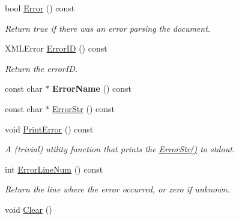 \begin{DoxyCompactItemize}
\item 
bool \hyperlink{classtinyxml2_1_1XMLDocument_abf0f9ac4c3aa5698a785937f71f7a69f}{Error} () const \hypertarget{classtinyxml2_1_1XMLDocument_abf0f9ac4c3aa5698a785937f71f7a69f}{}\label{classtinyxml2_1_1XMLDocument_abf0f9ac4c3aa5698a785937f71f7a69f}

\begin{DoxyCompactList}\small\item\em Return true if there was an error parsing the document. \end{DoxyCompactList}\item 
X\+M\+L\+Error \hyperlink{classtinyxml2_1_1XMLDocument_a34903418c9e83f27945c2c533839e350}{Error\+ID} () const \hypertarget{classtinyxml2_1_1XMLDocument_a34903418c9e83f27945c2c533839e350}{}\label{classtinyxml2_1_1XMLDocument_a34903418c9e83f27945c2c533839e350}

\begin{DoxyCompactList}\small\item\em Return the error\+ID. \end{DoxyCompactList}\item 
const char $\ast$ {\bfseries Error\+Name} () const \hypertarget{classtinyxml2_1_1XMLDocument_a7ff8b68f87042d535841b0afd2c82161}{}\label{classtinyxml2_1_1XMLDocument_a7ff8b68f87042d535841b0afd2c82161}

\item 
const char $\ast$ \hyperlink{classtinyxml2_1_1XMLDocument_afa6df3166e31985f1e54bd2073e2faad}{Error\+Str} () const 
\item 
void \hyperlink{classtinyxml2_1_1XMLDocument_a7545cc9a9a67eee9307c001aa316a388}{Print\+Error} () const \hypertarget{classtinyxml2_1_1XMLDocument_a7545cc9a9a67eee9307c001aa316a388}{}\label{classtinyxml2_1_1XMLDocument_a7545cc9a9a67eee9307c001aa316a388}

\begin{DoxyCompactList}\small\item\em A (trivial) utility function that prints the \hyperlink{classtinyxml2_1_1XMLDocument_afa6df3166e31985f1e54bd2073e2faad}{Error\+Str()} to stdout. \end{DoxyCompactList}\item 
int \hyperlink{classtinyxml2_1_1XMLDocument_a22876562274ac31884bafb9e5cb64aa1}{Error\+Line\+Num} () const \hypertarget{classtinyxml2_1_1XMLDocument_a22876562274ac31884bafb9e5cb64aa1}{}\label{classtinyxml2_1_1XMLDocument_a22876562274ac31884bafb9e5cb64aa1}

\begin{DoxyCompactList}\small\item\em Return the line where the error occurred, or zero if unknown. \end{DoxyCompactList}\item 
void \hyperlink{classtinyxml2_1_1XMLDocument_a65656b0b2cbc822708eb351504178aaf}{Clear} ()\hypertarget{classtinyxml2_1_1XMLDocument_a65656b0b2cbc822708eb351504178aaf}{}\label{classtinyxml2_1_1XMLDocument_a65656b0b2cbc822708eb351504178aaf}


\end{DoxyCompactItemize}
